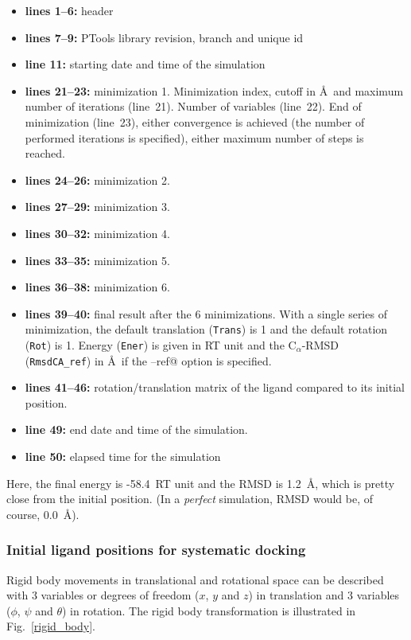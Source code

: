 \documentclass[12pt,a4paper]{article}
\begin{document}
\begin{itemize}
\item{\bf lines 1--6:} header
\item{\bf lines 7--9:} PTools library revision, branch and unique id
\item{\bf line 11:} starting date and time of the simulation
\item{\bf lines 21--23:} minimization 1. Minimization index, cutoff 
in \AA\ and maximum number of iterations (line~21). 
Number of variables (line~22). End of minimization (line~23), either 
convergence is achieved (the number of performed iterations is specified), 
either maximum number of steps is reached.
\item{\bf lines 24--26:} minimization 2.
\item{\bf lines 27--29:} minimization 3.
\item{\bf lines 30--32:} minimization 4.
\item{\bf lines 33--35:} minimization 5.
\item{\bf lines 36--38:} minimization 6.
\item{\bf lines 39--40:} final result after the 6 minimizations. With a single series of minimization, the default translation ({\tt Trans}) is 1 and the default rotation ({\tt Rot}) is 1. 
Energy ({\tt Ener}) is given in RT unit and the C$_{\alpha}$-RMSD 
({\tt RmsdCA\_ref}) in \AA\ if the \verb@--ref@ option is specified.
\item{\bf lines 41--46:} rotation/translation matrix of the ligand compared to its initial position.
\item{\bf line 49:} end date and time of the simulation.
\item{\bf line 50:} elapsed time for the simulation
\end{itemize}

Here, the final energy is -58.4~RT unit and the RMSD is 1.2~\AA, which is pretty close from the initial position. (In a \emph{perfect} simulation, RMSD would be, of course, 0.0~\AA).

\subsubsection{Initial ligand positions for systematic docking}
Rigid body movements in translational and rotational space can be described
with 3 variables or degrees of freedom ($x$, $y$ and $z$) in translation 
and 3 variables ($\phi$, $\psi$ and $\theta$) in rotation. The rigid body 
transformation is illustrated in Fig.~\ref{rigid_body}.
\end{document}
